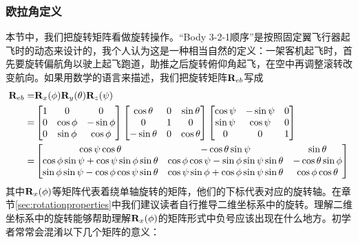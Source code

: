 \documentclass[11pt]{article}
\begin{document}
\subsubsection{欧拉角定义}
本节中，我们把旋转矩阵看做旋转操作。“Body 3-2-1顺序”是按照固定翼飞行器起飞时的动态来设计的，我个人认为这是一种相当自然的定义：一架客机起飞时，首先要旋转偏航角以驶上起飞跑道，助推之后旋转俯仰角起飞，在空中再调整滚转改变航向。如果用数学的语言来描述，我们把旋转矩阵${\bf R}_{eb}$写成
\begin{align}
{\bf R}_{eb} = &  {\bf R}_x(\phi){\bf R}_y(\theta){\bf R}_z(\psi) \\
\label{eqn:eulerparts}	= &
\begin{bmatrix}
1 & 0 & 0 \\
0 & \cos\phi & -\sin\phi \\
0 & \sin\phi & \cos\phi 
\end{bmatrix} 
\begin{bmatrix}
\cos\theta & 0 & \sin\theta\\
0 & 1 & 0\\
-\sin\theta & 0 & \cos\theta \\
\end{bmatrix}
\begin{bmatrix}
\cos\psi & - \sin\psi & 0\\
\sin\psi & \cos\psi & 0\\
0 & 0 & 1
\end{bmatrix}\\
\label{eqn:euler}= &
\begin{bmatrix}
                             \cos\psi\cos\theta&                             -\cos\theta\sin\psi&           \sin\theta \\
\cos\phi\sin\psi + \cos\psi\sin\phi\sin\theta& \cos\phi\cos\psi - \sin\phi\sin\psi\sin\theta& -\cos\theta\sin\phi	\\
\sin\phi\sin\psi - \cos\phi\cos\psi\sin\theta& \cos\psi\sin\phi + \cos\phi\sin\psi\sin\theta&  \cos\phi\cos\theta
\end{bmatrix} 
\end{align}
其中${\bf R}_x(\phi)$等矩阵代表着绕单轴旋转的矩阵，他们的下标代表对应的旋转轴。在章节\ref{sec:rotationproperties}中我们建议读者自行推导二维坐标系中的旋转。理解二维坐标系中的旋转能够帮助理解${\bf R}_x(\phi)$的矩阵形式中负号应该出现在什么地方。初学者常常会混淆以下几个矩阵的意义：
\end{document}
